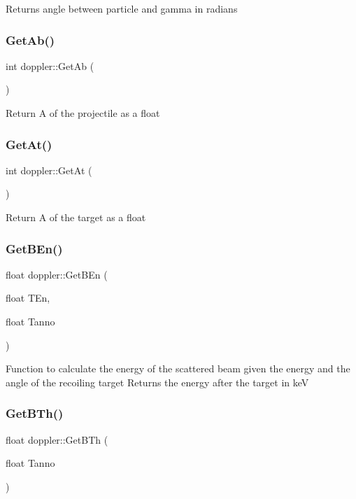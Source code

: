 Returns angle between particle and gamma in radians \mbox{\label{classdoppler_ac3cde63421ff794992231027245ceced}} 
\subsubsection{\texorpdfstring{Get\+Ab()}{GetAb()}}
{\footnotesize\ttfamily int doppler\+::\+Get\+Ab (\begin{DoxyParamCaption}{ }\end{DoxyParamCaption})}

Return A of the projectile as a float \mbox{\label{classdoppler_a72bb0dc1707c0f2bf4b978caf06f2cf1}} 
\subsubsection{\texorpdfstring{Get\+At()}{GetAt()}}
{\footnotesize\ttfamily int doppler\+::\+Get\+At (\begin{DoxyParamCaption}{ }\end{DoxyParamCaption})}

Return A of the target as a float \mbox{\label{classdoppler_a182d987ddc6db4a8b8e7f7821bda3846}} 
\subsubsection{\texorpdfstring{Get\+B\+En()}{GetBEn()}}
{\footnotesize\ttfamily float doppler\+::\+Get\+B\+En (\begin{DoxyParamCaption}\item[{float}]{T\+En,  }\item[{float}]{Tanno }\end{DoxyParamCaption})}

Function to calculate the energy of the scattered beam given the energy and the angle of the recoiling target Returns the energy after the target in keV \mbox{\label{classdoppler_ac834d80156ae80009b508ae41fedde3d}} 
\subsubsection{\texorpdfstring{Get\+B\+Th()}{GetBTh()}}
{\footnotesize\ttfamily float doppler\+::\+Get\+B\+Th (\begin{DoxyParamCaption}\item[{float}]{Tanno }\end{DoxyParamCaption})}

